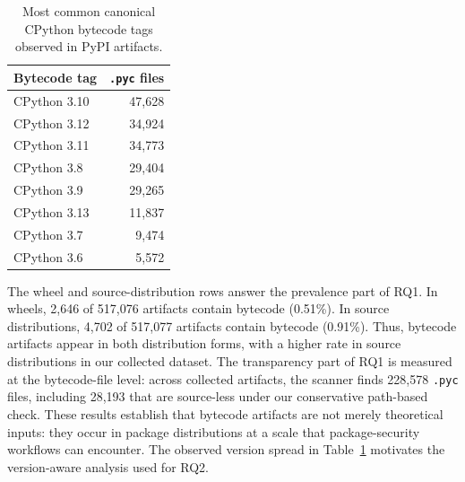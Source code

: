 \begin{table}[t]
  \centering
  \caption{Most common canonical CPython bytecode tags observed in PyPI artifacts.}
  \label{tab:bytecode-versions}
  \begin{tabular}{lr}
    \toprule
    Bytecode tag & \texttt{.pyc} files \\
    \midrule
    CPython 3.10 & 47{,}628 \\
    CPython 3.12 & 34{,}924 \\
    CPython 3.11 & 34{,}773 \\
    CPython 3.8 & 29{,}404 \\
    CPython 3.9 & 29{,}265 \\
    CPython 3.13 & 11{,}837 \\
    CPython 3.7 & 9{,}474 \\
    CPython 3.6 & 5{,}572 \\
    \bottomrule
  \end{tabular}
\end{table}

The wheel and source-distribution rows answer the prevalence part of RQ1.  In wheels, 2{,}646 of 517{,}076 artifacts contain bytecode (0.51\%).  In source distributions, 4{,}702 of 517{,}077 artifacts contain bytecode (0.91\%).  Thus, bytecode artifacts appear in both distribution forms, with a higher rate in source distributions in our collected dataset.  The transparency part of RQ1 is measured at the bytecode-file level: across collected artifacts, the scanner finds 228{,}578 \texttt{.pyc} files, including 28{,}193 that are source-less under our conservative path-based check.  These results establish that bytecode artifacts are not merely theoretical inputs: they occur in package distributions at a scale that package-security workflows can encounter.  The observed version spread in Table~\ref{tab:bytecode-versions} motivates the version-aware analysis used for RQ2.
